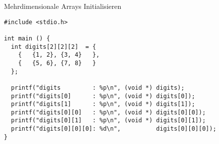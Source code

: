 
\begin{frame}[fragile]{Mehrdimensionale Arrays Initialisieren}
%
\begin{codebox}
\begin{verbatim}
#include <stdio.h>

int main () {
  int digits[2][2][2]  = {
    {   {1, 2}, {3, 4}   }, 
    {   {5, 6}, {7, 8}   }
  };
  
  printf("digits         : %p\n", (void *) digits);
  printf("digits[0]      : %p\n", (void *) digits[0]);
  printf("digits[1]      : %p\n", (void *) digits[1]);
  printf("digits[0][0]   : %p\n", (void *) digits[0][0]);
  printf("digits[0][1]   : %p\n", (void *) digits[0][1]);
  printf("digits[0][0][0]: %d\n",          digits[0][0][0]);
}
\end{verbatim}
\end{codebox}
%
\end{frame}


